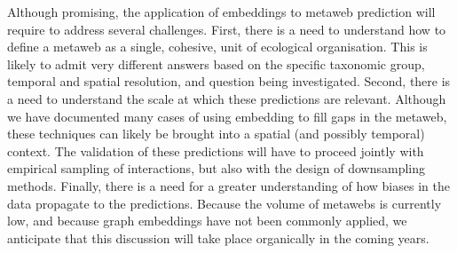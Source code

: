 \documentclass[
  letterpaper,
  DIV=11,
  numbers=noendperiod]{scrartcl}
\begin{document}
Although promising, the application of embeddings to metaweb prediction
will require to address several challenges. First, there is a need to
understand how to define a metaweb as a single, cohesive, unit of
ecological organisation. This is likely to admit very different answers
based on the specific taxonomic group, temporal and spatial resolution,
and question being investigated. Second, there is a need to understand
the scale at which these predictions are relevant. Although we have
documented many cases of using embedding to fill gaps in the metaweb,
these techniques can likely be brought into a spatial (and possibly
temporal) context. The validation of these predictions will have to
proceed jointly with empirical sampling of interactions, but also with
the design of downsampling methods. Finally, there is a need for a
greater understanding of how biases in the data propagate to the
predictions. Because the volume of metawebs is currently low, and
because graph embeddings have not been commonly applied, we anticipate
that this discussion will take place organically in the coming years.
\end{document}
